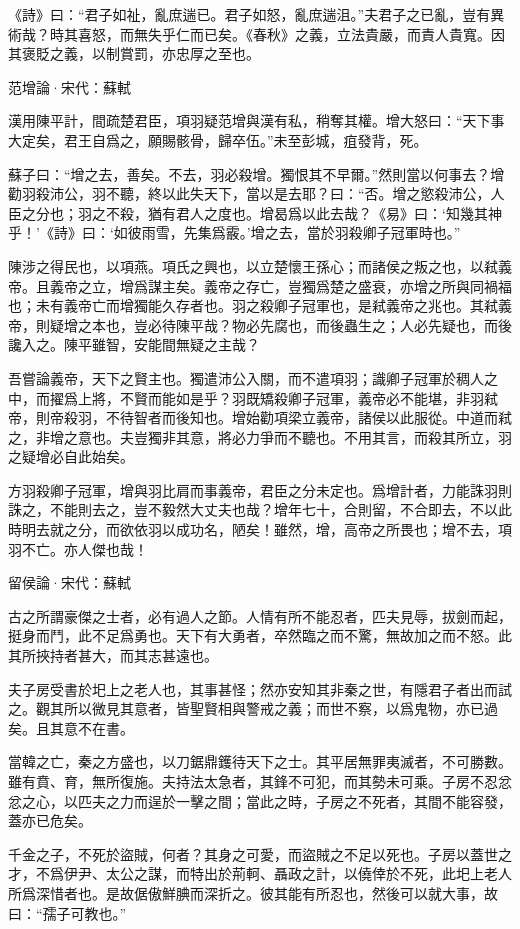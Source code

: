 \documentclass[12pt,a4paper]{ctexbook}
\begin{document}
《詩》曰：“君子如祉，亂庶遄已。君子如怒，亂庶遄沮。”夫君子之已亂，豈有異術哉？時其喜怒，而無失乎仁而已矣。《春秋》之義，立法貴嚴，而責人貴寬。因其褒貶之義，以制賞罰，亦忠厚之至也。\par
范增論·宋代：蘇軾 \par
漢用陳平計，間疏楚君臣，項羽疑范增與漢有私，稍奪其權。增大怒曰：“天下事大定矣，君王自爲之，願賜骸骨，歸卒伍。”未至彭城，疽發背，死。\par
蘇子曰：“增之去，善矣。不去，羽必殺增。獨恨其不早爾。”然則當以何事去？增勸羽殺沛公，羽不聽，終以此失天下，當以是去耶？曰：“否。增之慾殺沛公，人臣之分也；羽之不殺，猶有君人之度也。增曷爲以此去哉？《易》曰：‘知幾其神乎！’《詩》曰：‘如彼雨雪，先集爲霰。’增之去，當於羽殺卿子冠軍時也。”\par
陳涉之得民也，以項燕。項氏之興也，以立楚懷王孫心；而諸侯之叛之也，以弒義帝。且義帝之立，增爲謀主矣。義帝之存亡，豈獨爲楚之盛衰，亦增之所與同禍福也；未有義帝亡而增獨能久存者也。羽之殺卿子冠軍也，是弒義帝之兆也。其弒義帝，則疑增之本也，豈必待陳平哉？物必先腐也，而後蟲生之；人必先疑也，而後讒入之。陳平雖智，安能間無疑之主哉？\par
吾嘗論義帝，天下之賢主也。獨遣沛公入關，而不遣項羽；識卿子冠軍於稠人之中，而擢爲上將，不賢而能如是乎？羽既矯殺卿子冠軍，義帝必不能堪，非羽弒帝，則帝殺羽，不待智者而後知也。增始勸項梁立義帝，諸侯以此服從。中道而弒之，非增之意也。夫豈獨非其意，將必力爭而不聽也。不用其言，而殺其所立，羽之疑增必自此始矣。\par
方羽殺卿子冠軍，增與羽比肩而事義帝，君臣之分未定也。爲增計者，力能誅羽則誅之，不能則去之，豈不毅然大丈夫也哉？增年七十，合則留，不合即去，不以此時明去就之分，而欲依羽以成功名，陋矣！雖然，增，高帝之所畏也；增不去，項羽不亡。亦人傑也哉！\par
留侯論·宋代：蘇軾 \par
古之所謂豪傑之士者，必有過人之節。人情有所不能忍者，匹夫見辱，拔劍而起，挺身而鬥，此不足爲勇也。天下有大勇者，卒然臨之而不驚，無故加之而不怒。此其所挾持者甚大，而其志甚遠也。\par
夫子房受書於圯上之老人也，其事甚怪；然亦安知其非秦之世，有隱君子者出而試之。觀其所以微見其意者，皆聖賢相與警戒之義；而世不察，以爲鬼物，亦已過矣。且其意不在書。\par
當韓之亡，秦之方盛也，以刀鋸鼎鑊待天下之士。其平居無罪夷滅者，不可勝數。雖有賁、育，無所復施。夫持法太急者，其鋒不可犯，而其勢未可乘。子房不忍忿忿之心，以匹夫之力而逞於一擊之間；當此之時，子房之不死者，其間不能容發，蓋亦已危矣。\par
千金之子，不死於盜賊，何者？其身之可愛，而盜賊之不足以死也。子房以蓋世之才，不爲伊尹、太公之謀，而特出於荊軻、聶政之計，以僥倖於不死，此圯上老人所爲深惜者也。是故倨傲鮮腆而深折之。彼其能有所忍也，然後可以就大事，故曰：“孺子可教也。”\par
\end{document}
